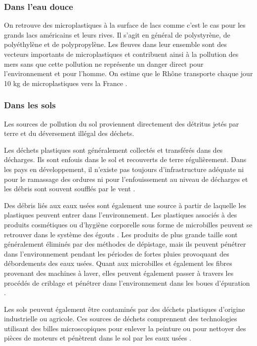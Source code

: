 \subsubsection{Dans l'eau douce}
\par{
On retrouve des microplastiques \`a la surface de lacs comme c'est le cas pour les grands lacs am\'ericains et leurs rives. Il s'agit en g\'en\'eral de polystyr\`ene, de poly\'ethyl\`ene et de polypropyl\`ene. Les  fleuves  dans  leur  ensemble  sont  des  vecteurs importants  de  microplastiques  et  contribuent  ainsi  \`a  la pollution  des  mers sans que cette pollution ne repr\'esente un danger direct pour l'environnement et pour l'homme. On estime que le Rh\^one transporte chaque jour 10 kg de microplastiques vers la France {\citep{Schafer2015}}.
}

\subsubsection{Dans les sols}
\par{
Les sources de pollution du sol proviennent directement des d\'etritus jet\'es par terre et du d\'eversement ill\'egal des d\'echets.
}
\par{
Les d\'echets plastiques sont g\'en\'eralement collect\'es et transf\'er\'es dans des d\'echarges. Ils sont enfouis dans le sol et recouverts de terre r\'eguli\`erement. Dans les pays en d\'eveloppement, il n'existe pas toujours d'infrastructure ad\'equate ni pour le ramassage des ordures ni pour l'enfouissement au niveau de d\'echarges et les d\'ebris sont souvent souffl\'es par le vent {\citep{lambert2014occurrence}}. 
}
\par{
Des d\'ebris li\'es aux eaux us\'ees sont \'egalement une source \`a partir de laquelle les plastiques peuvent entrer dans l'environnement. Les plastiques associ\'es \`a des produits cosm\'etiques ou d'hygi\`ene corporelle sous forme de microbilles peuvent se retrouver dans le syst\`eme des \'egouts {\citep{Schafer2015}}. Les produits de plus grande taille sont g\'en\'eralement \'elimin\'es par des m\'ethodes de d\'epistage, mais ils peuvent p\'en\'etrer dans l'environnement pendant les p\'eriodes de fortes pluies provoquant des d\'ebordements des eaux us\'ees. Quant aux microbilles et \'egalement les fibres provenant des machines \`a laver, elles peuvent \'egalement passer \`a travers les proc\'ed\'es de criblage et p\'en\'etrer dans l'environnement dans les boues d'\'epuration {\citep{lambert2014occurrence}}.
 }
 \par{
Les sols peuvent \'egalement \^etre contamin\'es par des d\'echets plastiques d'origine industrielle ou agricole. Ces sources de d\'echets comprennent des technologies utilisant des billes microscopiques pour enlever la peinture ou pour nettoyer des pi\`eces de moteurs et p\'en\`etrent dans le sol par les eaux us\'ees {\citep{lambert2014occurrence}}. 
}
